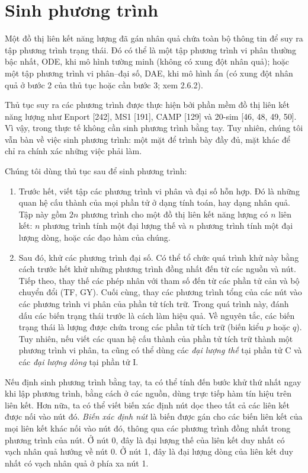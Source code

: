 \section{Sinh phương trình}
Một đồ thị liên kết năng lượng đã gán nhân quả chứa toàn bộ thông tin để suy ra tập phương trình trạng thái. Đó có thể là một tập phương trình vi phân thường bậc nhất, ODE, khi mô hình tường minh (không có xung đột nhân quả); hoặc một tập phương trình vi phân--đại số, DAE, khi mô hình ẩn (có xung đột nhân quả ở bước 2 của thủ tục hoặc cần bước 3; xem 2.6.2).

Thủ tục suy ra các phương trình được thực hiện bởi phần mềm đồ thị liên kết năng lượng như Enport [242], MS1 [191], CAMP [129] và 20-sim [46, 48, 49, 50]. Vì vậy, trong thực tế không cần sinh phương trình bằng tay. Tuy nhiên, chúng tôi vẫn bàn về việc sinh phương trình: một mặt để trình bày đầy đủ, mặt khác để chỉ ra chính xác những việc phải làm.

Chúng tôi dùng thủ tục sau để sinh phương trình:
\begin{enumerate}
\item Trước hết, viết tập các phương trình vi phân và đại số hỗn hợp. Đó là những quan hệ cấu thành của mọi phần tử ở dạng tính toán, hay dạng nhân quả. Tập này gồm $2n$ phương trình cho một đồ thị liên kết năng lượng có $n$ liên kết: $n$ phương trình tính một đại lượng thế và $n$ phương trình tính một đại lượng dòng, hoặc các đạo hàm của chúng.
\item Sau đó, khử các phương trình đại số. Có thể tổ chức quá trình khử này bằng cách trước hết khử những phương trình đồng nhất đến từ các nguồn và nút. Tiếp theo, thay thế các phép nhân với tham số đến từ các phần tử cản và bộ chuyển đổi (TF, GY). Cuối cùng, thay các phương trình tổng của các nút vào các phương trình vi phân của phần tử tích trữ. Trong quá trình này, đánh dấu các biến trạng thái trước là cách làm hiệu quả. Về nguyên tắc, các biến trạng thái là lượng được chứa trong các phần tử tích trữ (biến kiểu $p$ hoặc $q$). Tuy nhiên, nếu viết các quan hệ cấu thành của phần tử tích trữ thành một phương trình vi phân, ta cũng có thể dùng các \emph{đại lượng thế} tại phần tử C và các \emph{đại lượng dòng} tại phần tử I.
\end{enumerate}

Nếu định sinh phương trình bằng tay, ta có thể tính đến bước khử thứ nhất ngay khi lập phương trình, bằng cách ở các nguồn, dùng trực tiếp hàm tín hiệu trên liên kết. Hơn nữa, ta có thể viết biến xác định nút dọc theo tất cả các liên kết được nối vào nút đó. \emph{Biến xác định nút} là biến được gán cho các biến liên kết của mọi liên kết khác nối vào nút đó, thông qua các phương trình đồng nhất trong phương trình của nút. Ở nút 0, đây là đại lượng thế của liên kết duy nhất có vạch nhân quả hướng về nút 0. Ở nút 1, đây là đại lượng dòng của liên kết duy nhất có vạch nhân quả ở phía xa nút 1.

